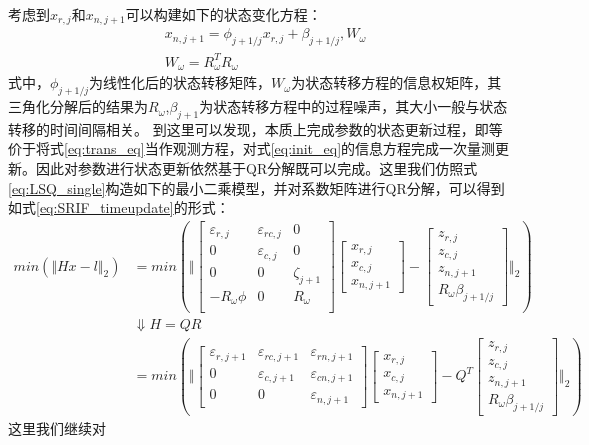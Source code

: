 考虑到\(x_{r,j}\)和\(x_{n,j+1}\)可以构建如下的状态变化方程：
\begin{equation}
	\begin{aligned}
	& x_{n,j+1} = \phi_{j+1/j}x_{r,j}+ \beta_{j+1/j},W_{\omega}   \\ 
	& W_{\omega}=R_{\omega}^{T}R_{\omega}
	\end{aligned}
	\label{eq:trans_eq}
\end{equation}
式中，\(\phi_{j+1/j}\)为线性化后的状态转移矩阵，\(W_{\omega}\)为状态转移方程的信息权矩阵，其三角化分解后的结果为\(R_{\omega}\),\(\beta_{j+1}\)为状态转移方程中的过程噪声，其大小一般与状态转移的时间间隔相关。
到这里可以发现，本质上完成参数的状态更新过程，即等价于将式\eqref{eq:trans_eq}当作观测方程，对式\eqref{eq:init_eq}的信息方程完成一次量测更新。因此对参数进行状态更新依然基于QR分解既可以完成。这里我们仿照式\eqref{eq:LSQ_single}构造如下的最小二乘模型，并对系数矩阵进行QR分解，可以得到如式\eqref{eq:SRIF_timeupdate}的形式：
\begin{equation}
  \begin{aligned}
	 min(\Vert Hx-l \Vert_{2}) & = min(\Vert
	 \begin{bmatrix}
		\varepsilon_{r,j} & \varepsilon_{rc,j} & 0 \\
		0 & \varepsilon_{c,j} & 0 \\
		0 & 0 & \zeta_{j+1} \\
		-R_{\omega}\phi & 0 & R_{\omega}\\
	\end{bmatrix}
	\begin{bmatrix}
		x_{r,j}\\
		x_{c,j}\\
		x_{n,j+1}
	\end{bmatrix}
	-
	\begin{bmatrix}
		z_{r,j}\\
		z_{c,j}\\
		z_{n,j+1} \\
		R_{\omega}\beta_{j+1/j}
	\end{bmatrix}
	\Vert_{2} )\\
	& \Downarrow H = QR \\
	& = min(\Vert 
	\begin{bmatrix}
	\varepsilon_{r,j+1} & \varepsilon_{rc,j+1} & \varepsilon_{rn,j+1} \\
	0 & \varepsilon_{c,j+1} & \varepsilon_{cn,j+1} \\
	0 & 0 & \varepsilon_{n,j+1}
	\end{bmatrix}
	\begin{bmatrix}
		x_{r,j}\\
		x_{c,j}\\
		x_{n,j+1}
	\end{bmatrix}
	-
	Q^{T}
	\begin{bmatrix}
		z_{r,j}\\
		z_{c,j}\\
		z_{n,j+1} \\
		R_{\omega}\beta_{j+1/j}
	\end{bmatrix}
	\Vert_{2})
  \end{aligned}	
  \label{eq:SRIF_timeupdate}
\end{equation}
这里我们继续对


